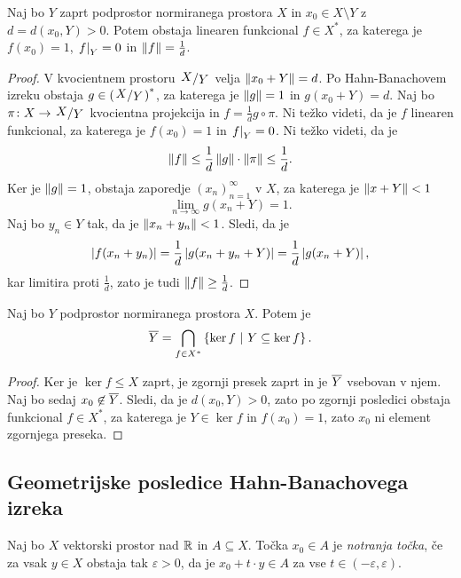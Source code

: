 \begin{posledica}
Naj bo $Y$ zaprt podprostor normiranega prostora $X$ in
$x_0 \in X \setminus Y$ z $d = d(x_0, Y) > 0$. Potem obstaja
linearen funkcional $f \in X^*$, za katerega je $f(x_0) = 1$,
$\left. f\right|_{Y}^{} = 0$ in $\left\lVert f\right\rVert = \frac{1}{d}$.
\end{posledica}

\begin{proof}
V kvocientnem prostoru $\kvoc{X}{Y}$ velja $\left\lVert x_0 + Y\right\rVert = d$. Po
Hahn-Banachovem izreku obstaja $g \in \left(\kvoc{X}{Y}\right)^*$,
za katerega je $\left\lVert g\right\rVert = 1$ in $g(x_0 + Y) = d$. Naj bo
$\pi \colon X \to \kvoc{X}{Y}$ kvocientna projekcija in
$f = \frac{1}{d} g \circ \pi$. Ni težko videti, da je $f$ linearen
funkcional, za katerega je $f(x_0) = 1$ in $\left. f\right|_{Y}^{} = 0$.
Ni težko videti, da je
\[
\left\lVert f\right\rVert \leq
\frac{1}{d} \left\lVert g\right\rVert \cdot \left\lVert \pi\right\rVert \leq \frac{1}{d}.
\]
Ker je $\left\lVert g\right\rVert = 1$, obstaja zaporedje $(x_n)_{n=1}^\infty$ v
$X$, za katerega je $\left\lVert x + Y\right\rVert < 1$
\[
\lim_{n \to \infty} g(x_n + Y) = 1.
\]
Naj bo $y_n \in Y$ tak, da je $\left\lVert x_n + y_n\right\rVert < 1$. Sledi, da je
\[
\left\lvert f(x_n + y_n)\right\rvert = \frac{1}{d} \left\lvert g(x_n + y_n + Y)\right\rvert =
\frac{1}{d} \left\lvert g(x_n + Y)\right\rvert,
\]
kar limitira proti $\frac{1}{d}$, zato je tudi
$\left\lVert f\right\rVert \geq \frac{1}{d}$.
\end{proof}

\begin{izrek}
Naj bo $Y$ podprostor normiranega prostora $X$. Potem je
\[
\overline{Y} =
\bigcap_{f \in X^*} \left\{\ker f~\middle\vert~Y \subseteq \ker f\right\}.
\]
\end{izrek}

\begin{proof}
Ker je $\ker f \leq X$ zaprt, je zgornji presek zaprt in je
$\overline{Y}$ vsebovan v njem. Naj bo sedaj $x_0 \not \in \overline{Y}$.
Sledi, da je $d(x_0, Y) > 0$, zato po zgornji posledici obstaja
funkcional $f \in X^*$, za katerega je $Y \in \ker f$ in
$f(x_0) = 1$, zato $x_0$ ni element zgornjega preseka.
\end{proof}

\newpage

\subsection{Geometrijske posledice Hahn-Banachovega izreka}


\begin{definicija}
Naj bo $X$ vektorski prostor nad $\mathbb{R}$ in $A \subseteq X$. Točka
$x_0 \in A$ je \emph{notranja točka}, če za vsak
$y \in X$ obstaja tak $\varepsilon > 0$, da je
$x_0 + t \cdot y \in A$ za vse $t \in (-\varepsilon, \varepsilon)$.
\end{definicija}

